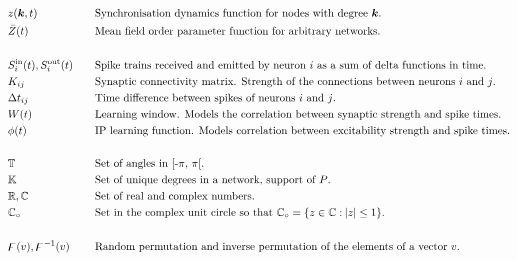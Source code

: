 \begin{alignat*}{2}
& z({\boldsymbol{k}}, t) &&\text{Synchronisation dynamics function for nodes with degree ${\boldsymbol{k}}$.}\\
& \bar{Z}(t) &&\text{Mean field order parameter function for arbitrary networks.}\\ \\
& S_i^{\rm in}(t), S_i^{\rm out}(t)\quad &&\text{Spike trains received and emitted by neuron $i$ as a sum of delta functions in time.}\\ 
& K_{ij} &&\text{Synaptic connectivity matrix. Strength of the connections between neurons $i$ and $j$.}\\
& \Delta t_{ij} &&\text{Time difference between spikes of neurons $i$ and $j$.}\\
& W(t) &&\text{Learning window. Models the correlation between synaptic strength and spike times.}\\ 
& \phi(t) &&\text{IP learning function. Models correlation between excitability strength and spike times.}\\ \\
& {\mathbb{T}} &&\text{Set of angles in [-$\pi$, $\pi$[.}\\
& {\mathbb{K}} &&\text{Set of unique degrees in a network, support of $P$.}\\ 
& {\mathbb{R}}, {\mathbb{C}} &&\text{Set of real and complex numbers.}\\ 
&  \mathbb{C}_\circ && \text{Set in the complex unit circle so that $\mathbb{C}_\circ = \{ z \in {\mathbb{C}} : \: \rvert z \rvert \leq 1 \} $.} \\ \\
& {\digamma}(v), {\digamma^{-1}}(v) &&\text{Random permutation and inverse permutation of the elements of a vector $v$.}\\ 
\end{alignat*}
